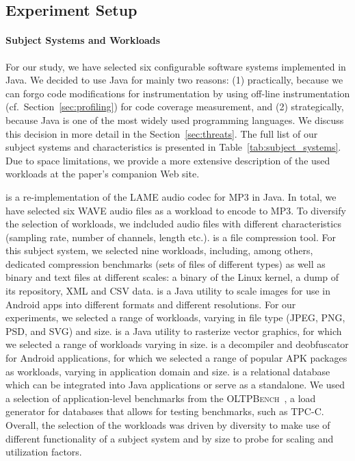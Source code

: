 \subsection{Experiment Setup}\label{sec:setup}
\paragraph*{Subject Systems and Workloads}
For our study, we have selected six configurable software systems implemented in Java. We decided to use Java for mainly two reasons: (1) practically, because we can forgo code modifications for instrumentation by using off-line instrumentation (cf.~Section~\ref{sec:profiling}) for code coverage measurement, and (2) strategically, because Java is one of the most widely used programming languages. We discuss this decision in more detail in the Section~\ref{sec:threats}. 
The full list of our subject systems and characteristics is presented in Table~\ref{tab:subject_systems}. Due to space limitations, we provide a more extensive description of the used workloads at the paper's companion Web site.
	
\jumper is a re-implementation of the LAME audio codec for MP3 in Java. In total, we have selected six WAVE audio files as a workload to encode to MP3. To diversify the selection of workloads, we indcluded audio files with different characteristics (sampling rate, number of channels, length etc.). 
\kanzi is a file compression tool. For this subject system, we selected nine workloads, including, among others, dedicated compression benchmarks (sets of files of different types) as well as binary and text files at different scales: a binary of the Linux kernel, a dump of its repository, XML and CSV data. 
\dconvert is a Java utility to scale images for use in Android apps into different formats and different resolutions. For our experiments, we selected a range of workloads, varying in file type (JPEG, PNG, PSD, and SVG) and size.
\batik is a Java utility to rasterize vector graphics, for which we selected a range of workloads varying in size.
\jadx is a decompiler and deobfuscator for Android applications, for which we selected a range of popular APK packages as workloads, varying in application domain and size.
\htwo is a relational database which can be integrated into Java applications or serve as a standalone. We used a selection of application-level benchmarks from the \textsc{OLTPBench}~\cite{difallah_oltp_2013}, a load generator for databases that allows for testing benchmarks, such as \textsc{TPC-C}. Overall, the selection of the workloads was driven by diversity to make use of different functionality of a subject system and by size to probe for scaling and utilization factors.
	
